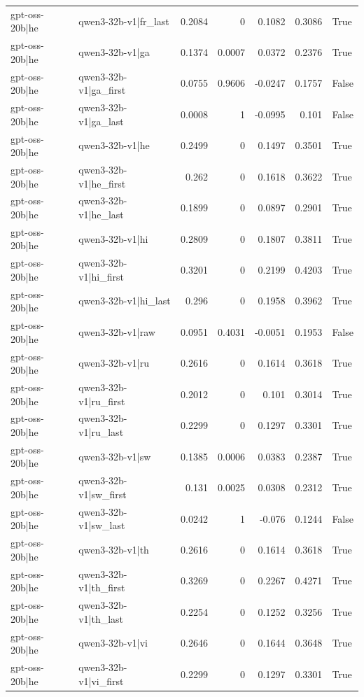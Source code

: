 \begin{table}
\begin{tabular}{l l r r r r l}
gpt-oss-20b|he & qwen3-32b-v1|fr_last & 0.2084 & 0 & 0.1082 & 0.3086 & True \\
gpt-oss-20b|he & qwen3-32b-v1|ga & 0.1374 & 0.0007 & 0.0372 & 0.2376 & True \\
gpt-oss-20b|he & qwen3-32b-v1|ga_first & 0.0755 & 0.9606 & -0.0247 & 0.1757 & False \\
gpt-oss-20b|he & qwen3-32b-v1|ga_last & 0.0008 & 1 & -0.0995 & 0.101 & False \\
gpt-oss-20b|he & qwen3-32b-v1|he & 0.2499 & 0 & 0.1497 & 0.3501 & True \\
gpt-oss-20b|he & qwen3-32b-v1|he_first & 0.262 & 0 & 0.1618 & 0.3622 & True \\
gpt-oss-20b|he & qwen3-32b-v1|he_last & 0.1899 & 0 & 0.0897 & 0.2901 & True \\
gpt-oss-20b|he & qwen3-32b-v1|hi & 0.2809 & 0 & 0.1807 & 0.3811 & True \\
gpt-oss-20b|he & qwen3-32b-v1|hi_first & 0.3201 & 0 & 0.2199 & 0.4203 & True \\
gpt-oss-20b|he & qwen3-32b-v1|hi_last & 0.296 & 0 & 0.1958 & 0.3962 & True \\
gpt-oss-20b|he & qwen3-32b-v1|raw & 0.0951 & 0.4031 & -0.0051 & 0.1953 & False \\
gpt-oss-20b|he & qwen3-32b-v1|ru & 0.2616 & 0 & 0.1614 & 0.3618 & True \\
gpt-oss-20b|he & qwen3-32b-v1|ru_first & 0.2012 & 0 & 0.101 & 0.3014 & True \\
gpt-oss-20b|he & qwen3-32b-v1|ru_last & 0.2299 & 0 & 0.1297 & 0.3301 & True \\
gpt-oss-20b|he & qwen3-32b-v1|sw & 0.1385 & 0.0006 & 0.0383 & 0.2387 & True \\
gpt-oss-20b|he & qwen3-32b-v1|sw_first & 0.131 & 0.0025 & 0.0308 & 0.2312 & True \\
gpt-oss-20b|he & qwen3-32b-v1|sw_last & 0.0242 & 1 & -0.076 & 0.1244 & False \\
gpt-oss-20b|he & qwen3-32b-v1|th & 0.2616 & 0 & 0.1614 & 0.3618 & True \\
gpt-oss-20b|he & qwen3-32b-v1|th_first & 0.3269 & 0 & 0.2267 & 0.4271 & True \\
gpt-oss-20b|he & qwen3-32b-v1|th_last & 0.2254 & 0 & 0.1252 & 0.3256 & True \\
gpt-oss-20b|he & qwen3-32b-v1|vi & 0.2646 & 0 & 0.1644 & 0.3648 & True \\
gpt-oss-20b|he & qwen3-32b-v1|vi_first & 0.2299 & 0 & 0.1297 & 0.3301 & True \\

\end{tabular}
\end{table}
